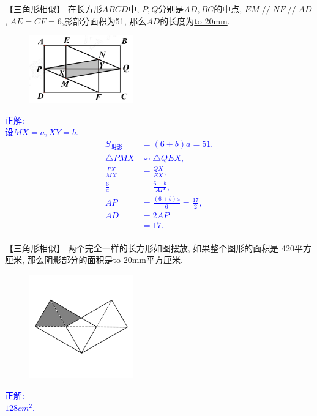 \item {
    【三角形相似】
    在长方形$ABCD$中, $P,Q$分别是$AD,BC$的中点, $EM\mathop{//}NF\mathop{//}AD$, $AE=CF=6$,影部分面积为51, 那么$AD$的长度为\underline{\hbox to 20mm{}}.
    \begin{figure}[H] 
        \centering
        \includegraphics[width=0.4\textwidth]{./pics/Chapter_2/1.png}
    \end{figure}
    \ifshowSolution 
        \fangsong{}\textcolor{blue}{
            正解: \\
            设$MX=a, XY =b$.\\
            \begin{align*}
                S_{阴影} &= (6+b)a = 51. \\
                \triangle PMX &\backsim \triangle QEX,\\
                \frac{PX}{MX} &= \frac{QX}{EX}, \\
                \frac{6}{a} &= \frac{6+b}{AP}, \\
                AP &= \frac{(6+b)a}{6} = \frac{17}{2}, \\
                AD &= 2AP \\
                &= 17. \\
            \end{align*}
        }
    \else
        \vspace{1cm}
    \fi
}

\item {
    【三角形相似】
    两个完全一样的长方形如图摆放, 如果整个图形的面积是 420平方厘米, 那么阴影部分的面积是\underline{\hbox to 20mm{}}平方厘米.
    \begin{figure}[H]
        \centering
        \includegraphics[width=0.4\textwidth]{./pics/Chapter_2/5.png}
    \end{figure}
    \ifshowSolution 
        \fangsong{}\textcolor{blue}{
            正解: \\
            $128 {cm}^2$.
        }
    \else
        \vspace{1cm}
    \fi
}

